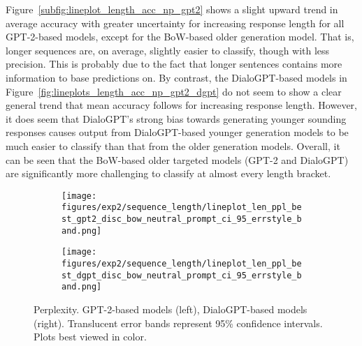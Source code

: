 
Figure~\ref{subfig:lineplot_length_acc_np_gpt2} shows a slight upward trend in average accuracy with greater uncertainty for increasing response length for all GPT-2-based models, except for the BoW-based older generation model. That is, longer sequences are, on average, slightly easier to classify, though with less precision. This is probably due to the fact that longer sentences contains more information to base predictions on. 
By contrast, the DialoGPT-based models in Figure~\ref{fig:lineplots_length_acc_np_gpt2_dgpt} do not seem to show a clear general trend that mean accuracy follows for increasing response length. However, it does seem that DialoGPT's strong bias towards generating younger sounding responses causes output from DialoGPT-based younger generation models to be much easier to classify than that from the older generation models. Overall, it can be seen that the BoW-based older targeted models (GPT-2 and DialoGPT) are significantly more challenging to classify at almost every length bracket.

\begin{figure}[H]
     \centering
     \begin{subfigure}[b]{0.49\textwidth}
        \centering
\texttt{[image: figures/exp2/sequence\_length/lineplot\_len\_ppl\_best\_gpt2\_disc\_bow\_neutral\_prompt\_ci\_95\_errstyle\_band.png]}
        \caption{}
        \label{subfig:lineplot_length_ppl_np_gpt2}
     \end{subfigure}
     \hfill
     \begin{subfigure}[b]{0.49\textwidth}
        \centering
        \texttt{[image: figures/exp2/sequence\_length/lineplot\_len\_ppl\_best\_dgpt\_disc\_bow\_neutral\_prompt\_ci\_95\_errstyle\_band.png]}
        \caption{}
        \label{subfig:lineplot_length_ppl_np_dgpt}
     \end{subfigure}
        \caption{Perplexity. GPT-2-based models (left), DialoGPT-based models (right). Translucent error bands represent 95\% confidence intervals. Plots best viewed in color.}
        \label{fig:lineplots_length_ppl_np_gpt2_dgpt}
\end{figure}

